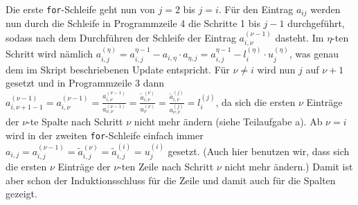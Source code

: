 \documentclass{article}
\theoremstyle{definition}
\begin{document}
\begin{enumerate}[(a)]
    Die erste \lstinline{for}-Schleife geht nun von $j=2$ bis $j=i$. Für den Eintrag $a_{ij}$ werden nun durch die Schleife in Programmzeile 4 die Schritte 1 bis $j-1$ durchgeführt, sodass nach dem Durchführen der Schleife der Eintrag $a_{i,\nu}^{(\nu-1)}$ dasteht. Im $\eta$-ten Schritt wird nämlich $a_{i,j}^{(\eta)} = a_{i,j}^{\eta - 1} - a_{i,\eta}\cdot a_{\eta,j} = a_{i,j}^{\eta - 1} - l^{(\eta)}_i\cdot u^{(\eta)}_j$, was genau dem im Skript beschriebenen Update entspricht. Für $\nu \neq i$ wird nun $j$ auf $\nu + 1$ gesetzt und in Programmzeile 3 dann $a^{(\nu-1)}_{i,\nu +1-1} = a^{(\nu-1)}_{i,\nu} = \frac{a^{(\nu-1)}_{i,\nu}}{a^{(\nu-1)}_{\nu, \nu}} = \frac{\tilde{a}^{(\nu)}_{i,\nu}}{u^{(\nu)}_{\nu}} = \frac{\tilde{a}^{(j)}_{i,\nu}}{a^{(j)}_{\nu,\nu}} = l_i^{(j)}$, da sich die ersten $\nu$ Einträge der $\nu$-te Spalte nach Schritt $\nu$ nicht mehr ändern (siehe Teilaufgabe a). Ab $\nu = i$ wird in der zweiten \lstinline{for}-Schleife einfach immer $a_{i,j} = a^{(\nu-1)}_{i,j} = \tilde{a}^{(\nu)}_{i,j} = \tilde{a}^{(i)}_{i,j} = u^{(i)}_j$ gesetzt. (Auch hier benutzen wir, dass sich die ersten $\nu$ Einträge der $\nu$-ten Zeile nach Schritt $\nu$ nicht mehr ändern.) Damit ist aber schon der Induktionsschluss für die Zeile und damit auch für die Spalten gezeigt.
\end{enumerate}
\end{document}
